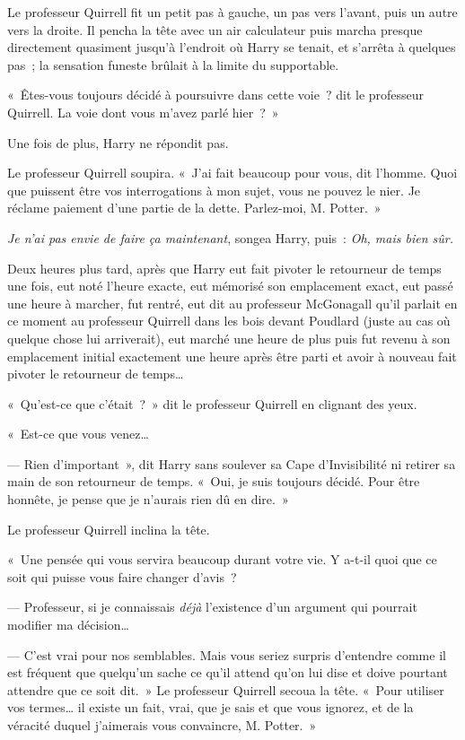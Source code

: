 Le professeur Quirrell fit un petit pas à gauche, un pas vers l'avant, puis un autre vers la droite.
Il pencha la tête avec un air calculateur puis marcha presque directement quasiment jusqu'à l'endroit où Harry se tenait, et s'arrêta à quelques pas~; la sensation funeste brûlait à la limite du supportable.

«~Êtes-vous toujours décidé à poursuivre dans cette voie~? dit le professeur Quirrell.
La voie dont vous m'avez parlé hier~?~»

Une fois de plus, Harry ne répondit pas.

Le professeur Quirrell soupira.
«~J'ai fait beaucoup pour vous, dit l'homme.
Quoi que puissent être vos interrogations à mon sujet, vous ne pouvez le nier.
Je réclame paiement d'une partie de la dette.
Parlez-moi, M. Potter.~»

\emph{Je n'ai pas envie de faire ça maintenant}, songea Harry, puis~: \emph{Oh, mais bien sûr.}

\later

Deux heures plus tard, après que Harry eut fait pivoter le retourneur de temps une fois, eut noté l'heure exacte, eut mémorisé son emplacement exact, eut passé une heure à marcher, fut rentré, eut dit au professeur McGonagall qu'il parlait en ce moment au professeur Quirrell dans les bois devant Poudlard (juste au cas où quelque chose lui arriverait), eut marché une heure de plus puis fut revenu à son emplacement initial exactement une heure après être parti et avoir à nouveau fait pivoter le retourneur de temps…

\later

«~Qu'est-ce que c'était~?~»
dit le professeur Quirrell en clignant des yeux.

«~Est-ce que vous venez…

--- Rien d'important~», dit Harry sans soulever sa Cape d'Invisibilité ni retirer sa main de son retourneur de temps.
«~Oui, je suis toujours décidé.
Pour être honnête, je pense que je n'aurais rien dû en dire.~»

Le professeur Quirrell inclina la tête.

«~Une pensée qui vous servira beaucoup durant votre vie.
Y a-t-il quoi que ce soit qui puisse vous faire changer d'avis~?

--- Professeur, si je connaissais \emph{déjà} l'existence d'un argument qui pourrait modifier ma décision…

--- C'est vrai pour nos semblables.
Mais vous seriez surpris d'entendre comme il est fréquent que quelqu'un sache ce qu'il attend qu'on lui dise et doive pourtant attendre que ce soit dit.~»
Le professeur Quirrell secoua la tête.
«~Pour utiliser vos termes… il existe un fait, vrai, que je sais et que vous ignorez, et de la véracité duquel j'aimerais vous convaincre, M. Potter.~»

